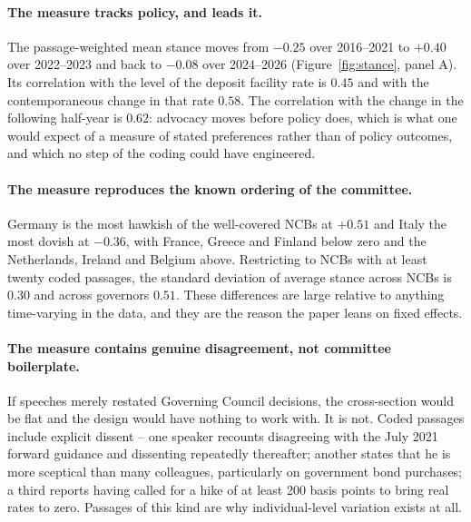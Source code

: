 \documentclass[11pt]{article}
\theoremstyle{plain}
\begin{document}
\paragraph{The measure tracks policy, and leads it.}
The passage-weighted mean stance moves from $-0.25$ over 2016--2021 to $+0.40$ over 2022--2023 and back to $-0.08$ over 2024--2026 (Figure~\ref{fig:stance}, panel A). Its correlation with the level of the deposit facility rate is $0.45$ and with the contemporaneous change in that rate $0.58$. The correlation with the change in the following half-year is $0.62$: advocacy moves before policy does, which is what one would expect of a measure of stated preferences rather than of policy outcomes, and which no step of the coding could have engineered.

\paragraph{The measure reproduces the known ordering of the committee.}
Germany is the most hawkish of the well-covered NCBs at $+0.51$ and Italy the most dovish at $-0.36$, with France, Greece and Finland below zero and the Netherlands, Ireland and Belgium above. Restricting to NCBs with at least twenty coded passages, the standard deviation of average stance across NCBs is $0.30$ and across governors $0.51$. These differences are large relative to anything time-varying in the data, and they are the reason the paper leans on fixed effects.

\paragraph{The measure contains genuine disagreement, not committee boilerplate.}
If speeches merely restated Governing Council decisions, the cross-section would be flat and the design would have nothing to work with. It is not. Coded passages include explicit dissent -- one speaker recounts disagreeing with the July 2021 forward guidance and dissenting repeatedly thereafter; another states that he is more sceptical than many colleagues, particularly on government bond purchases; a third reports having called for a hike of at least 200 basis points to bring real rates to zero. Passages of this kind are why individual-level variation exists at all.
\end{document}
